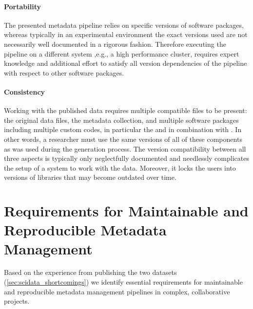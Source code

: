 \paragraph{Portability} The presented metadata pipeline relies on specific versions of software packages, whereas typically in an experimental environment the exact versions used are not necessarily well documented in a rigorous fashion. Therefore executing the pipeline on a different system ,e.g., a high performance cluster, requires expert knowledge and additional effort to satisfy all version dependencies of the pipeline with respect to other software packages.

\paragraph{Consistency} Working with the published data requires multiple compatible files to be present: the original data files, the metadata collection, and multiple software packages including multiple custom codes, in particular the  and  in combination with . In other words, a researcher must use the same versions of all of these components as was used during the  generation process. The version compatibility between all three aspects is typically only neglectfully documented and needlessly complicates the setup of a system to work with the data. Moreover, it locks the users into versions of libraries that may become outdated over time.



\section{Requirements for Maintainable and Reproducible Metadata Management}
\label{sec:metadata_requirements}
Based on the experience from publishing the two datasets (\cref{sec:scidata_shortcomings}) we identify essential requirements for maintainable and reproducible metadata management pipelines in complex, collaborative projects.

